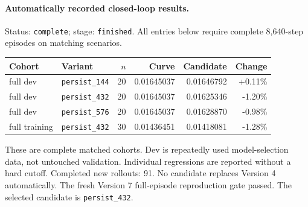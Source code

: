 \paragraph{Automatically recorded closed-loop results.}
Status: \texttt{complete}; stage: \texttt{finished}.
All entries below require complete 8,640-step episodes on matching scenarios.
\begin{center}\small
\begin{tabular}{llrrrr}\toprule
Cohort & Variant & $n$ & Curve & Candidate & Change \\\midrule
full dev & \texttt{persist\_144} & 20 & 0.01645037 & 0.01646792 & +0.11\% \\
full dev & \texttt{persist\_432} & 20 & 0.01645037 & 0.01625346 & -1.20\% \\
full dev & \texttt{persist\_576} & 20 & 0.01645037 & 0.01628870 & -0.98\% \\
full training & \texttt{persist\_432} & 30 & 0.01436451 & 0.01418081 & -1.28\% \\
\bottomrule\end{tabular}\end{center}
These are complete matched cohorts. Dev is repeatedly used model-selection data, not untouched validation. Individual regressions are reported without a hard cutoff.
Completed new rollouts: 91. No candidate replaces Version 4 automatically.
The fresh Version 7 full-episode reproduction gate passed.
The selected candidate is \texttt{persist\_432}.
